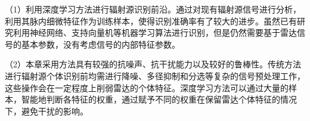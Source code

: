 （1）利用深度学习方法进行辐射源识别前沿。通过对现有辐射源信号进行分析，利用其脉内细微特征作为训练样本，使得识别准确率有了较大的进步。虽然已有研究利用神经网络、支持向量机等机器学习算法进行识别，但是仍然需要基于雷达信号的基本参数，没有考虑信号的内部特征参数。

（2）本章采用方法具有较强的抗噪声、抗干扰能力以及较好的鲁棒性。传统方法进行辐射源个体识别前均需进行降噪、多径抑制和分选等复杂的信号预处理工作，这些操作会在一定程度上削弱雷达的个体特征。深度学习方法可以通过大量的样本，智能地判断各特征的权重，通过赋予不同的权重在保留雷达个体特征的情况下，避免干扰的影响。


